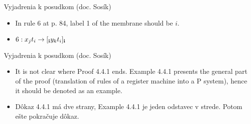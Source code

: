 \begin{frame}[t]{Vyjadrenia k posudkom (doc. Sosík)}
  \begin{itemize}
    \item In rule 6 at p. 84, label 1 of the membrane should be $i$.
    \item $6: x_jt_i\rightarrow [_{\bf i} y_kt_i ]_{\bf i}$
  \end{itemize}
\end{frame}

\begin{frame}[t]{Vyjadrenia k posudkom (doc. Sosík)}
  \begin{itemize}
    \item It is not clear where Proof 4.4.1 ends. Example 4.4.1 presents the general part of the proof (translation of rules of a register machine into a P system), hence it should be denoted as an example.
    \pause
    \item Dôkaz 4.4.1 má dve strany, Example 4.4.1 je jeden odstavec v strede. Potom ešte pokračuje dôkaz.
  \end{itemize}
\end{frame}

